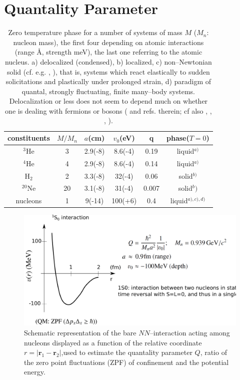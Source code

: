 \section{Quantality Parameter}\label{App1A}
\begin{table}
 \begin{tabular}{|c|c|c|c|c|c|}
 \hline \rule[-2ex]{0pt}{5.5ex}   constituents& $M/M_n$  & $a$(cm) &$v_0$(eV)  &q&phase($T=0$)    \\ 
 \hline \rule[-2ex]{0pt}{5.5ex}   $^{3}$He &3& 2.9(-8)  &8.6(-4)  &0.19  &liquid$^{a)}$    \\ 
 \hline \rule[-2ex]{0pt}{5.5ex}  $^{4}$He  &4&  2.9(-8)&  8.6(-4)&  0.14& liquid$^{a)}$   \\ 
 \hline \rule[-2ex]{0pt}{5.5ex}    H$_2$&2&  3.3(-8)&  32(-4)&  0.06&solid$^{b)}$   \\ 
 \hline \rule[-2ex]{0pt}{5.5ex}    $^{20}$Ne&20& 3.1(-8) &  31(-4)&  0.007&solid$^b)$    \\ 
 \hline \rule[-2ex]{0pt}{5.5ex}    nucleons&1&  9(-14)& 100(+6) &  0.4&liquid$^{a),c),d)}$  \\ 
 \hline 
 \end{tabular}
 \caption{Zero temperature phase for a number of systems of mass $M$ ($M_n$: nucleon mass), the first four depending on atomic interactions (range \AA, strength meV), the last one referring to the atomic nucleus. a) delocalized (condensed), b) localized, c) non--Newtonian solid (cf. e.g. \cite{Bertsch:88b}, \cite{DeGennes:94}), that is, systems which react elastically to sudden solicitations and plastically under prolonged strain, d) paradigm of quantal, strongly fluctuating, finite many--body  systems. Delocalization or less does not seem to depend much on whether one is dealing with fermions or bosons (\cite{Mottelson:02} and refs. therein; cf also \cite{Ebran:14}, \cite{Ebran:14b}, \cite{Ebran:13}, \cite{Ebran:12}).}\label{tab1A1}
 \end{table}
 \begin{figure}
 \centerline{\includegraphics*[width=\textwidth,angle=0]{nutshell/figs/potential.pdf}}
 \caption{Schematic representation of the bare $NN$--interaction acting among nucleons displayed as a function of the relative coordinate $r=|\mathbf{r}_1-\mathbf{r}_2|$,used to estimate the quantality parameter $Q$, ratio of the zero point fluctuations (ZPF) of confinement and the potential energy.}\label{fig1A1}
 \end{figure}
